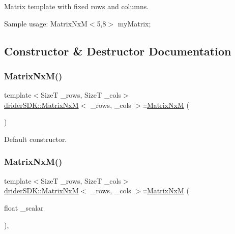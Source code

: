 Matrix template with fixed rows and columns.

Sample usage\+: Matrix\+Nx\+M$<$5,8$>$ my\+Matrix; 

\subsection{Constructor \& Destructor Documentation}
\mbox{\label{classdrider_s_d_k_1_1_matrix_nx_m_a6bb4435526729aa0f3b5e3a62b1f8198}} 
\subsubsection{\texorpdfstring{Matrix\+Nx\+M()}{MatrixNxM()}\hspace{0.1cm}{\footnotesize\ttfamily [1/3]}}
{\footnotesize\ttfamily template$<$SizeT \+\_\+rows, SizeT \+\_\+cols$>$ \\
\hyperlink{classdrider_s_d_k_1_1_matrix_nx_m}{drider\+S\+D\+K\+::\+Matrix\+NxM}$<$ \+\_\+rows, \+\_\+cols $>$\+::\hyperlink{classdrider_s_d_k_1_1_matrix_nx_m}{Matrix\+NxM} (\begin{DoxyParamCaption}{ }\end{DoxyParamCaption})\hspace{0.3cm}{\ttfamily [inline]}}

Default constructor. \mbox{\label{classdrider_s_d_k_1_1_matrix_nx_m_a3fdd8f83b66b5fb42810b34307de082c}} 
\subsubsection{\texorpdfstring{Matrix\+Nx\+M()}{MatrixNxM()}\hspace{0.1cm}{\footnotesize\ttfamily [2/3]}}
{\footnotesize\ttfamily template$<$SizeT \+\_\+rows, SizeT \+\_\+cols$>$ \\
\hyperlink{classdrider_s_d_k_1_1_matrix_nx_m}{drider\+S\+D\+K\+::\+Matrix\+NxM}$<$ \+\_\+rows, \+\_\+cols $>$\+::\hyperlink{classdrider_s_d_k_1_1_matrix_nx_m}{Matrix\+NxM} (\begin{DoxyParamCaption}\item[{float}]{\+\_\+scalar }\end{DoxyParamCaption})\hspace{0.3cm}{\ttfamily [inline]}, {\ttfamily [explicit]}}

